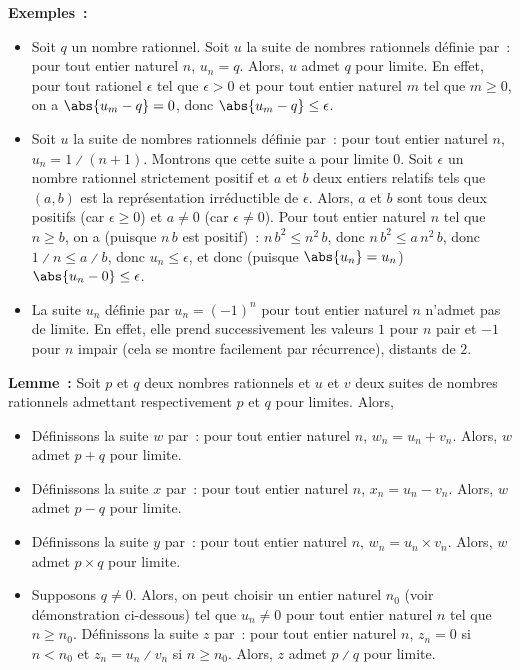     \done

\medskip

\noindent\textbf{Exemples :} 
\begin{itemize}[nosep]
    \item Soit $q$ un nombre rationnel. 
        Soit $u$ la suite de nombres rationnels définie par : pour tout entier naturel $n$, $u_n = q$.
        Alors, $u$ admet $q$ pour limite.
        En effet, pour tout rationel $\epsilon$ tel que $\epsilon > 0$ et pour tout entier naturel $m$ tel que $m \geq 0$, on a $\abs{u_m - q} = 0$, donc $\abs{u_m - q} \leq \epsilon$.
    \item Soit $u$ la suite de nombres rationnels définie par : pour tout entier naturel $n$, $u_n = 1 \divslash (n+1)$.
        Montrons que cette suite a pour limite $0$. 
        Soit $\epsilon$ un nombre rationnel strictement positif et $a$ et $b$ deux entiers relatifs tels que $(a, b)$ est la représentation irréductible de $\epsilon$.
        Alors, $a$ et $b$ sont tous deux positifs (car $\epsilon \geq 0$) et $a \neq 0$ (car $\epsilon \neq 0$).
        Pour tout entier naturel $n$ tel que $n \geq b$, on a (puisque $n \, b$ est positif) : $n \, b^2 \leq n^2 \, b$, donc $n \, b^2 \leq a \, n^2 \, b$, donc $1 \divslash n \leq a \divslash b$, donc $u_n \leq \epsilon$, et donc (puisque $\abs{u_n} = u_n$) $\abs{u_n - 0} \leq \epsilon$.
    \item La suite $u_n$ définie par $u_n = (-1)^n$ pour tout entier naturel $n$ n'admet pas de limite.
        En effet, elle prend successivement les valeurs $1$ pour $n$ pair et $-1$ pour $n$ impair (cela se montre facilement par récurrence), distants de $2$. 
\end{itemize}

\medskip

\noindent\textbf{Lemme :} Soit $p$ et $q$ deux nombres rationnels et $u$ et $v$ deux suites de nombres rationnels admettant respectivement $p$ et $q$ pour limites. 
    Alors, 
    \begin{itemize}[nosep]
        \item Définissons la suite $w$ par : pour tout entier naturel $n$, $w_n = u_n + v_n$. 
            Alors, $w$ admet $p + q$ pour limite.
        \item Définissons la suite $x$ par : pour tout entier naturel $n$, $x_n = u_n - v_n$. 
            Alors, $w$ admet $p - q$ pour limite.
        \item Définissons la suite $y$ par : pour tout entier naturel $n$, $w_n = u_n \times v_n$. 
            Alors, $w$ admet $p \times q$ pour limite.
        \item Supposons $q \neq 0$. 
            Alors, on peut choisir un entier naturel $n_0$ (voir démonstration ci-dessous) tel que $u_n \neq 0$ pour tout entier naturel $n$ tel que $n \geq n_0$.
            Définissons la suite $z$ par : pour tout entier naturel $n$, $z_n = 0$ si $n < n_0$ et $z_n = u_n \divslash v_n$ si $n \geq n_0$.
            Alors, $z$ admet $p \divslash q$ pour limite.
    \end{itemize}

